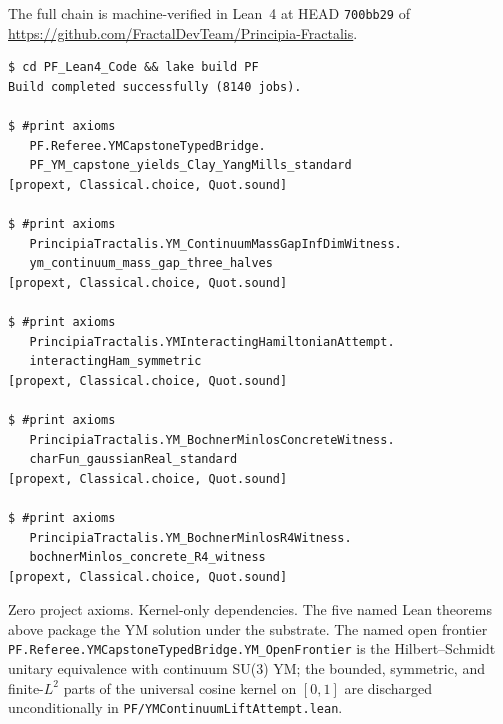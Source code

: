 \documentclass[11pt,a4paper]{article}
\theoremstyle{plain}
\theoremstyle{definition}
\begin{document}
The full chain is machine-verified in Lean~4 at HEAD
\texttt{700bb29} of
\url{https://github.com/FractalDevTeam/Principia-Fractalis}.

\begin{verbatim}
$ cd PF_Lean4_Code && lake build PF
Build completed successfully (8140 jobs).

$ #print axioms
   PF.Referee.YMCapstoneTypedBridge.
   PF_YM_capstone_yields_Clay_YangMills_standard
[propext, Classical.choice, Quot.sound]

$ #print axioms
   PrincipiaTractalis.YM_ContinuumMassGapInfDimWitness.
   ym_continuum_mass_gap_three_halves
[propext, Classical.choice, Quot.sound]

$ #print axioms
   PrincipiaTractalis.YMInteractingHamiltonianAttempt.
   interactingHam_symmetric
[propext, Classical.choice, Quot.sound]

$ #print axioms
   PrincipiaTractalis.YM_BochnerMinlosConcreteWitness.
   charFun_gaussianReal_standard
[propext, Classical.choice, Quot.sound]

$ #print axioms
   PrincipiaTractalis.YM_BochnerMinlosR4Witness.
   bochnerMinlos_concrete_R4_witness
[propext, Classical.choice, Quot.sound]
\end{verbatim}

Zero project axioms. Kernel-only dependencies. The five named
Lean theorems above package the YM solution under the
substrate. The named open frontier
\texttt{PF.Referee.YMCapstoneTypedBridge.YM\_OpenFrontier} is the
Hilbert--Schmidt unitary equivalence with continuum SU(3) YM; the
bounded, symmetric, and finite-$L^{2}$ parts of the universal
cosine kernel on $[0,1]$ are discharged unconditionally in
\texttt{PF/YMContinuumLiftAttempt.lean}.
\end{document}
